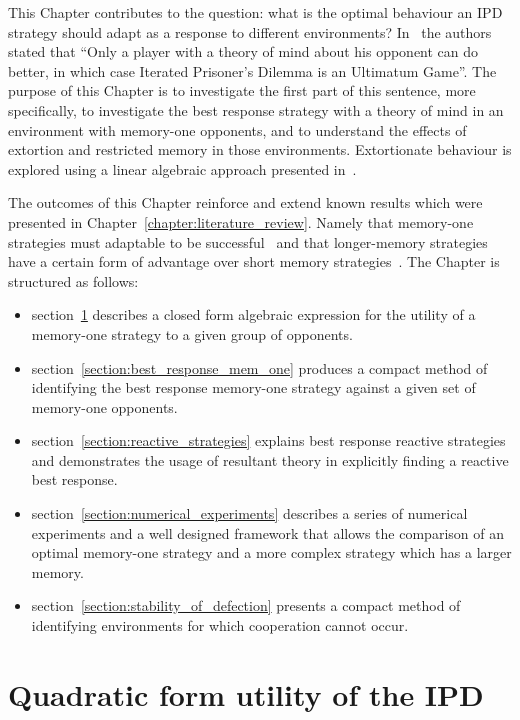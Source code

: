 This Chapter contributes to the question: what is the optimal behaviour an IPD
strategy should adapt as a response to different environments?
In~\cite{Press2012} the authors stated that ``Only a player with a theory of
mind about his opponent can do better, in which case Iterated Prisoner's Dilemma
is an Ultimatum Game''. The purpose of this Chapter is to investigate the first
part of this sentence, more specifically, to investigate the best response
strategy with a theory of mind in an environment with memory-one opponents, and
to understand the effects of extortion and restricted memory in those
environments. Extortionate behaviour is explored using a linear algebraic
approach presented in~\cite{Knight2019}.

The outcomes of this Chapter reinforce and extend known results which were presented in
Chapter~\ref{chapter:literature_review}. Namely that memory-one strategies must
adaptable to be successful~\cite{Knight2017, Knight2019} and
that longer-memory strategies have a certain form of advantage over short memory
strategies~\cite{Hilbe2017, Pan2015}. The Chapter is structured as follows:

\begin{itemize}
    \item section~\ref{section:utility} describes a closed form algebraic expression for
    the utility of a memory-one strategy to a given group of opponents.
    \item section~\ref{section:best_response_mem_one} produces a compact method
    of identifying the best response memory-one strategy against a given set
    of memory-one opponents.
    \item section~\ref{section:reactive_strategies} explains best response reactive
    strategies and demonstrates the usage of resultant theory in explicitly finding
    a reactive best response.
    \item section~\ref{section:numerical_experiments} describes a series of numerical experiments
    and a well designed framework that allows the
    comparison of an optimal memory-one strategy and a more complex strategy which
    has a larger memory.
    \item section~\ref{section:stability_of_defection} presents a compact method of identifying environments
    for which cooperation cannot occur.
\end{itemize}


\section{Quadratic form utility of the IPD}\label{section:utility}

